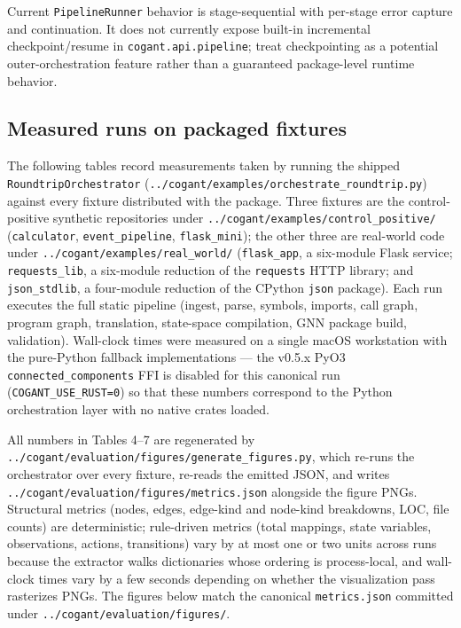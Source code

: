 \documentclass[
]{article}
\begin{document}
Current \texttt{PipelineRunner} behavior is stage-sequential with
per-stage error capture and continuation. It does not currently expose
built-in incremental checkpoint/resume in \texttt{cogant.api.pipeline};
treat checkpointing as a potential outer-orchestration feature rather
than a guaranteed package-level runtime behavior.

\subsection{Measured runs on packaged
fixtures}\label{measured-runs-on-packaged-fixtures}

The following tables record measurements taken by running the shipped
\texttt{RoundtripOrchestrator}
(\texttt{../cogant/examples/orchestrate\_roundtrip.py}) against every
fixture distributed with the package. Three fixtures are the
control-positive synthetic repositories under
\texttt{../cogant/examples/control\_positive/} (\texttt{calculator},
\texttt{event\_pipeline}, \texttt{flask\_mini}); the other three are
real-world code under \texttt{../cogant/examples/real\_world/}
(\texttt{flask\_app}, a six-module Flask service;
\texttt{requests\_lib}, a six-module reduction of the \texttt{requests}
HTTP library; and \texttt{json\_stdlib}, a four-module reduction of the
CPython \texttt{json} package). Each run executes the full static
pipeline (ingest, parse, symbols, imports, call graph, program graph,
translation, state-space compilation, GNN package build, validation).
Wall-clock times were measured on a single macOS workstation with the
pure-Python fallback implementations --- the v0.5.x PyO3
\texttt{connected\_components} FFI is disabled for this canonical run
(\texttt{COGANT\_USE\_RUST=0}) so that these numbers correspond to the
Python orchestration layer with no native crates loaded.

All numbers in Tables 4--7 are regenerated by
\texttt{../cogant/evaluation/figures/generate\_figures.py}, which
re-runs the orchestrator over every fixture, re-reads the emitted JSON,
and writes \texttt{../cogant/evaluation/figures/metrics.json} alongside
the figure PNGs. Structural metrics (nodes, edges, edge-kind and
node-kind breakdowns, LOC, file counts) are deterministic; rule-driven
metrics (total mappings, state variables, observations, actions,
transitions) vary by at most one or two units across runs because the
extractor walks dictionaries whose ordering is process-local, and
wall-clock times vary by a few seconds depending on whether the
visualization pass rasterizes PNGs. The figures below match the
canonical \texttt{metrics.json} committed under
\texttt{../cogant/evaluation/figures/}.
\end{document}
